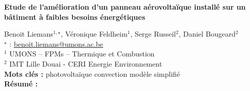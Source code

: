 


    \newpage

\BgThispage

%
\begin{flushleft}
\addtocounter{section}{1}
{\Large \textbf{Etude de l'amélioration d'un panneau aérovoltaïque installé sur un bâtiment à faibles besoins énergétiques}}\label{ref:86}
\end{flushleft}
%
Benoit Liemans$^{1,\star}$, Véronique Feldheim$^{1}$, Serge Russeil$^{2}$, Daniel Bougeard$^{2}$\\[2mm]
$^{\star}$ \Letter : \url{benoit.liemans@umons.ac.be}\\[2mm]
{\footnotesize $^{1}$ UMONS – FPMs – Thermique et Combustion}\\
{\footnotesize $^{2}$ IMT Lille Douai - CERI Energie Environnement}\\
[4mm]
%
\noindent \textbf{Mots clés : } photovoltaïque convection modèle simplifié\\[4mm]
%
\noindent \textbf{Résumé : } 

